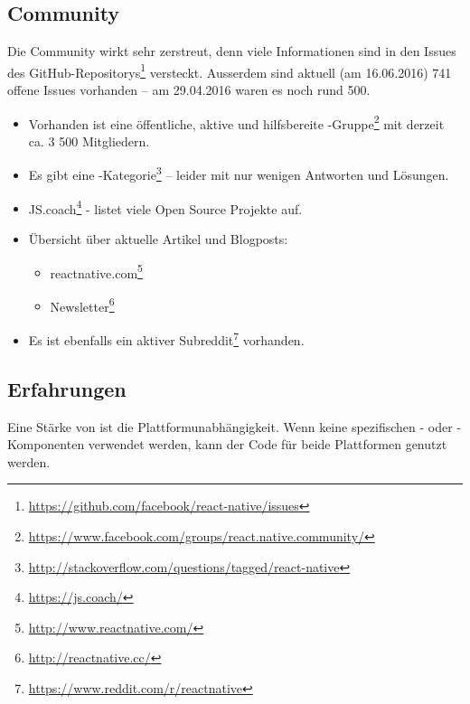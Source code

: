 \subsection{Community}
Die Community wirkt sehr zerstreut, denn viele Informationen sind in den Issues des  GitHub-Repositorys\footnote{\url{https://github.com/facebook/react-native/issues}} versteckt.
Ausserdem sind aktuell (am 16.06.2016) 741 offene Issues vorhanden -- am 29.04.2016 waren es noch rund 500.

\begin{itemize}
	\item Vorhanden ist eine öffentliche, aktive und hilfsbereite -Gruppe\footnote{\url{https://www.facebook.com/groups/react.native.community/}} mit derzeit ca. 3 500 Mitgliedern.
	\item Es gibt eine -Kategorie\footnote{\url{http://stackoverflow.com/questions/tagged/react-native}} -- leider mit nur wenigen Antworten und Lösungen.
	\item JS.coach\footnote{\url{https://js.coach/}} - listet viele Open Source Projekte auf.
	\item Übersicht über aktuelle Artikel und Blogposts: 
	\begin{itemize}
		\item reactnative.com\footnote{\url{http://www.reactnative.com/}}
		\item {} Newsletter\footnote{\url{http://reactnative.cc/}}
	\end{itemize}
	\item Es ist ebenfalls ein aktiver Subreddit\footnote{\url{https://www.reddit.com/r/reactnative}} vorhanden.
\end{itemize}


\subsection{Erfahrungen}
Eine Stärke von  ist die Plattformunabhängigkeit. 
Wenn keine spezifischen - oder -Komponenten verwendet werden, kann der Code für beide Plattformen genutzt werden.

